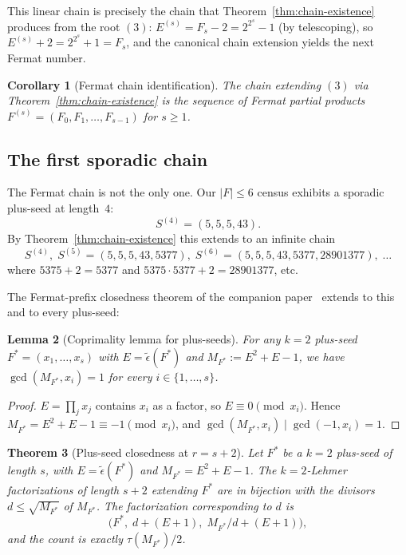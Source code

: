 \documentclass[11pt]{article}
\newtheorem{theorem}{Theorem}
\newtheorem{corollary}[theorem]{Corollary}
\newtheorem{lemma}[theorem]{Lemma}
\theoremstyle{definition}
\theoremstyle{remark}
\newcommand{\eps}{\tilde{\epsilon}}
\begin{document}
This linear chain is precisely the chain that
Theorem~\ref{thm:chain-existence} produces from the root $(3)$:
$E^{(s)} = F_s - 2 = 2^{2^s} - 1$ (by telescoping), so
$E^{(s)} + 2 = 2^{2^s} + 1 = F_s$, and the canonical chain extension
yields the next Fermat number.

\begin{corollary}[Fermat chain identification]\label{cor:fermat-chain}
The chain extending $(3)$ via Theorem~\ref{thm:chain-existence} is the
sequence of Fermat partial products $F^{(s)} = (F_0, F_1, \ldots,
F_{s-1})$ for $s \ge 1$.
\end{corollary}

\subsection{The first sporadic chain}

The Fermat chain is not the only one.  Our $|F| \le 6$ census exhibits
a sporadic plus-seed at length~$4$:
\[
  S^{(4)} = (5, 5, 5, 43).
\]
By Theorem~\ref{thm:chain-existence} this extends to an infinite
chain
\[
  S^{(4)},\;
  S^{(5)} = (5, 5, 5, 43, 5377),\;
  S^{(6)} = (5, 5, 5, 43, 5377, 28901377),\;
  \ldots
\]
where $5375 + 2 = 5377$ and $5375 \cdot 5377 + 2 = 28901377$, etc.

The Fermat-prefix closedness theorem of the companion
paper~\cite{Mfinish} extends to this and to every plus-seed:

\begin{lemma}[Coprimality lemma for plus-seeds]\label{lem:coprime}
For any $k = 2$ plus-seed $F^* = (x_1, \ldots, x_s)$ with $E =
\eps(F^*)$ and $M_{F^*} := E^2 + E - 1$, we have
$\gcd(M_{F^*}, x_i) = 1$ for every $i \in \{1, \ldots, s\}$.
\end{lemma}

\begin{proof}
$E = \prod_j x_j$ contains $x_i$ as a factor, so $E \equiv 0
\pmod{x_i}$.  Hence $M_{F^*} = E^2 + E - 1 \equiv -1 \pmod{x_i}$, and
$\gcd(M_{F^*}, x_i) \mid \gcd(-1, x_i) = 1$.
\end{proof}

\begin{theorem}[Plus-seed closedness at $r = s + 2$]\label{thm:plus-seed-closure}
Let $F^*$ be a $k = 2$ plus-seed of length $s$, with $E =
\eps(F^*)$ and $M_{F^*} = E^2 + E - 1$.  The $k = 2$-Lehmer
factorizations of length $s + 2$ extending $F^*$ are in bijection
with the divisors $d \le \sqrt{M_{F^*}}$ of $M_{F^*}$.  The
factorization corresponding to $d$ is
\[
  \bigl(F^*,\; d + (E + 1),\; M_{F^*}/d + (E + 1)\bigr),
\]
and the count is exactly $\tau(M_{F^*}) / 2$.
\end{theorem}
\end{document}

